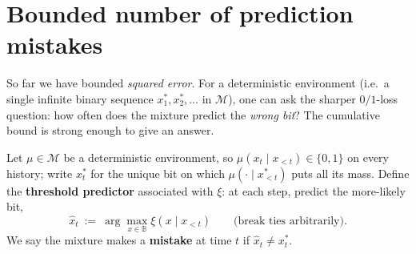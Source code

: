\documentclass[fontsize=11pt, parskip=half]{scrartcl}
\newcommand{\Mc}{\mathcal{M}}
\begin{document}




\section{Bounded number of prediction mistakes}\label{prob:mistakes}

So far we have bounded \emph{squared error}. For a deterministic environment
(i.e.\ a single infinite binary sequence $x_1^*, x_2^*, \dots$ in $\Mc$),
one can ask the sharper $0/1$-loss question: how often does the mixture predict
the \emph{wrong bit}? The cumulative bound is strong enough to give an answer.


Let $\mu \in \Mc$ be a deterministic environment, so $\mu(x_t \mid x_{<t}) \in
\{0,1\}$ on every history; write $x_t^*$ for the unique bit on which
$\mu(\cdot \mid x^*_{<t})$ puts all its mass. Define the \textbf{threshold
predictor} associated with $\xi$: at each step, predict the more-likely bit,
\[
  \hat{x}_t ~:=~ \arg\max_{x \in \mathbb{B}} \xi(x \mid x_{<t})
  \qquad \text{(break ties arbitrarily).}
\]
We say the mixture makes a \textbf{mistake} at time $t$ if $\hat{x}_t \neq x_t^*$.
\end{document}

